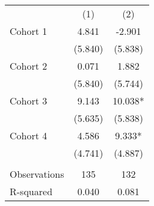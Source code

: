 \begin{tabular}{lcc} \hline
 & (1) & (2) \\
Cohort 1 & 4.841 & -2.901 \\
 & (5.840) & (5.838) \\
Cohort 2 & 0.071 & 1.882 \\
 & (5.840) & (5.744) \\
Cohort 3 & 9.143 & 10.038* \\
 & (5.635) & (5.838) \\
Cohort 4 & 4.586 & 9.333* \\
 & (4.741) & (4.887) \\
 &  &  \\
Observations & 135 & 132 \\
 R-squared & 0.040 & 0.081 \\ \hline
\end{tabular}

